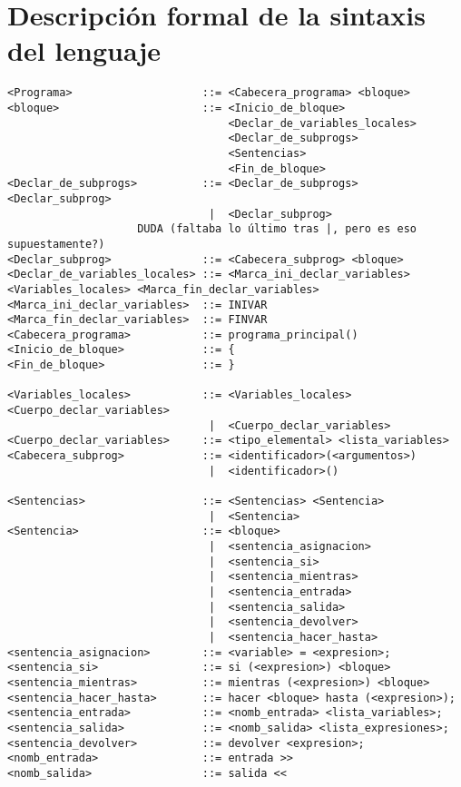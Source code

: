 \section{Descripción formal de la sintaxis del lenguaje}

\begin{verbatim}
<Programa>                    ::= <Cabecera_programa> <bloque>
<bloque>                      ::= <Inicio_de_bloque>
                                  <Declar_de_variables_locales>
                                  <Declar_de_subprogs>
                                  <Sentencias>
                                  <Fin_de_bloque>
<Declar_de_subprogs>          ::= <Declar_de_subprogs> <Declar_subprog>
                               |  <Declar_subprog> 
                    DUDA (faltaba lo último tras |, pero es eso supuestamente?)
<Declar_subprog>              ::= <Cabecera_subprog> <bloque>
<Declar_de_variables_locales> ::= <Marca_ini_declar_variables> <Variables_locales> <Marca_fin_declar_variables>
<Marca_ini_declar_variables>  ::= INIVAR
<Marca_fin_declar_variables>  ::= FINVAR
<Cabecera_programa>           ::= programa_principal()
<Inicio_de_bloque>            ::= {
<Fin_de_bloque>               ::= }

<Variables_locales>           ::= <Variables_locales> <Cuerpo_declar_variables>
                               |  <Cuerpo_declar_variables>
<Cuerpo_declar_variables>     ::= <tipo_elemental> <lista_variables>
<Cabecera_subprog>            ::= <identificador>(<argumentos>)
                               |  <identificador>()

<Sentencias>                  ::= <Sentencias> <Sentencia>
                               |  <Sentencia>
<Sentencia>                   ::= <bloque>
                               |  <sentencia_asignacion>
                               |  <sentencia_si>
                               |  <sentencia_mientras>
                               |  <sentencia_entrada>
                               |  <sentencia_salida>
                               |  <sentencia_devolver>
                               |  <sentencia_hacer_hasta>
<sentencia_asignacion>        ::= <variable> = <expresion>;
<sentencia_si>                ::= si (<expresion>) <bloque>
<sentencia_mientras>          ::= mientras (<expresion>) <bloque>
<sentencia_hacer_hasta>       ::= hacer <bloque> hasta (<expresion>);
<sentencia_entrada>           ::= <nomb_entrada> <lista_variables>;
<sentencia_salida>            ::= <nomb_salida> <lista_expresiones>;
<sentencia_devolver>          ::= devolver <expresion>;
<nomb_entrada>                ::= entrada >>
<nomb_salida>                 ::= salida <<


\end{verbatim}
